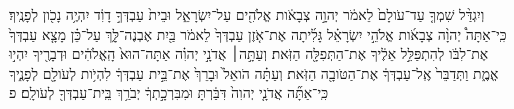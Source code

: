 \documentclass{openreader}
\begin{document}
וְיִגְדַּ֨ל שִׁמְךָ֤ עַד־עֹולָם֙ לֵאמֹ֔ר יְהוָ֣ה צְבָאֹ֔ות אֱלֹהִ֖ים עַל־יִשְׂרָאֵ֑ל וּבֵית֙ עַבְדְּךָ֣ דָוִ֔ד יִהְיֶ֥ה נָכֹ֖ון לְפָנֶֽיךָ׃ 
כִּֽי־אַתָּה֩ יְהוָ֨ה צְבָאֹ֜ות אֱלֹהֵ֣י יִשְׂרָאֵ֗ל גָּלִ֜יתָה אֶת־אֹ֤זֶן עַבְדְּךָ֙ לֵאמֹ֔ר בַּ֖יִת אֶבְנֶה־לָּ֑ךְ עַל־כֵּ֗ן מָצָ֤א עַבְדְּךָ֙ אֶת־לִבֹּ֔ו לְהִתְפַּלֵּ֣ל אֵלֶ֔יךָ אֶת־הַתְּפִלָּ֖ה הַזֹּֽאת׃ 
וְעַתָּ֣ה׀ אֲדֹנָ֣י יְהוִ֗ה אַתָּה־הוּא֙ הָֽאֱלֹהִ֔ים וּדְבָרֶ֖יךָ יִהְי֣וּ אֱמֶ֑ת וַתְּדַבֵּר֙ אֶֽל־עַבְדְּךָ֔ אֶת־הַטֹּובָ֖ה הַזֹּֽאת׃ 
וְעַתָּ֗ה הֹואֵל֙ וּבָרֵךְ֙ אֶת־בֵּ֣ית עַבְדְּךָ֔ לִהְיֹ֥ות לְעֹולָ֖ם לְפָנֶ֑יךָ כִּֽי־אַתָּ֞ה אֲדֹנָ֤י יְהוִה֙ דִּבַּ֔רְתָּ וּמִבִּרְכָ֣תְךָ֔ יְבֹרַ֥ךְ בֵּֽית־עַבְדְּךָ֖ לְעֹולָֽם׃ פ 
\end{document}
